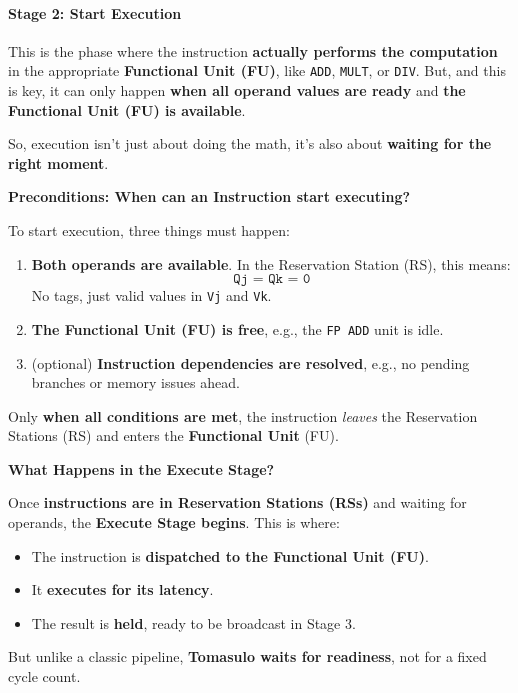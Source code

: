 \paragraph{Stage 2: Start Execution}

This is the phase where the instruction \textbf{actually performs the computation} in the appropriate \textbf{Functional Unit (FU)}, like \texttt{ADD}, \texttt{MULT}, or \texttt{DIV}. But, and this is key, it can only happen \textbf{when all operand values are ready} and \textbf{the Functional Unit (FU) is available}.

\highspace
So, execution isn't just about doing the math, it's also about \textbf{waiting for the right moment}.

\highspace
\begin{flushleft}
    \textcolor{Green3}{ \textbf{Preconditions: When can an Instruction start executing?}}
\end{flushleft}
To start execution, three things must happen:
\begin{enumerate}
    \item \textbf{Both operands are available}. In the Reservation Station (RS), this means:
    \begin{equation*}
        \texttt{Qj = Qk = 0}
    \end{equation*}
    No tags, just valid values in \texttt{Vj} and \texttt{Vk}.

    \item \textbf{The Functional Unit (FU) is free}, e.g., the \texttt{FP ADD} unit is idle.
    
    \item (optional) \textbf{Instruction dependencies are resolved}, e.g., no pending branches or memory issues ahead.
\end{enumerate}
Only \textbf{when all conditions are met}, the instruction \emph{leaves} the Reservation Stations (RS) and enters the \textbf{Functional Unit} (FU).

\highspace
\begin{flushleft}
    \textcolor{Green3}{ \textbf{What Happens in the Execute Stage?}}
\end{flushleft}
Once \textbf{instructions are in Reservation Stations (RSs)} and waiting for operands, the \textbf{Execute Stage begins}. This is where:
\begin{itemize}
    \item The instruction is \textbf{dispatched to the Functional Unit (FU)}.
    \item It \textbf{executes for its latency}.
    \item The result is \textbf{held}, ready to be broadcast in Stage 3.
\end{itemize}
But unlike a classic pipeline, \textbf{Tomasulo waits for readiness}, not for a fixed cycle count.

